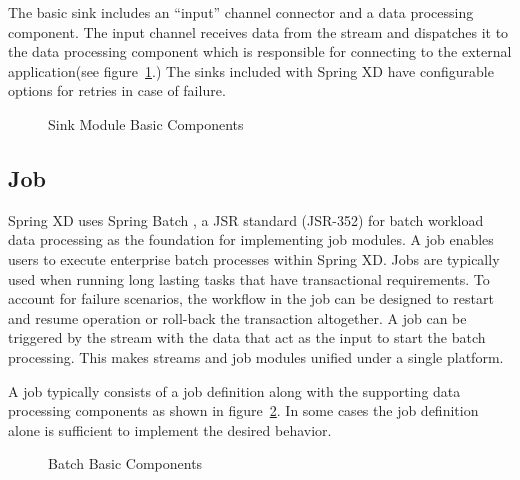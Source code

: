 \par

The basic sink includes an ``input'' channel connector and a data processing
component. The input channel receives data from the stream and dispatches
it to the data processing component which is responsible for connecting to the external
application(see figure~\ref{fig:sinkmbc}.) The sinks included with Spring XD have
configurable options for retries in case of failure.

\par

\begin{figure}
\centering
{}
\caption{Sink Module Basic Components}
\label{fig:sinkmbc}
\end{figure}

\par

\subsection{Job}
\label{sec:Job}
Spring XD uses Spring Batch \cite{spring-batch-reference}, a JSR standard (JSR-352)
for batch workload data processing as the foundation for implementing
job modules. A job enables users to execute enterprise batch processes within Spring XD.
Jobs are typically used when running long lasting tasks that have transactional requirements.
To account for failure scenarios, the workflow in the job can be designed to restart and
resume operation or roll-back the transaction altogether. A job can be triggered by the
stream with the data that act as the input to start the batch processing. This makes
streams and job modules unified under a single platform.

\par

A job typically consists of a job definition along with the supporting
data processing components as shown in figure~\ref{fig:batchmbc}.
In some cases the job definition alone is sufficient to implement the desired behavior.

\par

\begin{figure}
\centering
{}
\caption{Batch Basic Components}
\label{fig:batchmbc}
\end{figure}

\par 

